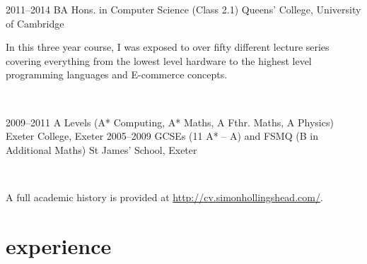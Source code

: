 \documentclass[]{friggeri-cv} %
\begin{document}
\begin{entrylist}
\entry
{2011--2014}
{BA Hons. {\normalfont in Computer Science (Class }2.1{\normalfont )}}
{Queens' College, University of Cambridge}
{In this three year course, I was exposed to over fifty different lecture series covering everything from the lowest level hardware to the highest level programming languages and E-commerce concepts.

~

}
\entry
{2009--2011}
{A Levels {\normalfont (}A* {\normalfont Computing, }A* {\normalfont Maths, }A {\normalfont Fthr. Maths, }A {\normalfont Physics)}}
{Exeter College, Exeter}
{}
\entry
{2005--2009}
{GCSEs {\normalfont (11 }A* {\normalfont -- }A{\normalfont ) and} FSMQ {\normalfont (}B {\normalfont in Additional Maths)}}
{St James' School, Exeter}
{
~

A full academic history is provided at \href{http://cv.simonhollingshead.com/grades.html}{http://cv.simonhollingshead.com/}.
}
\end{entrylist}


\section{experience}
\end{document}
